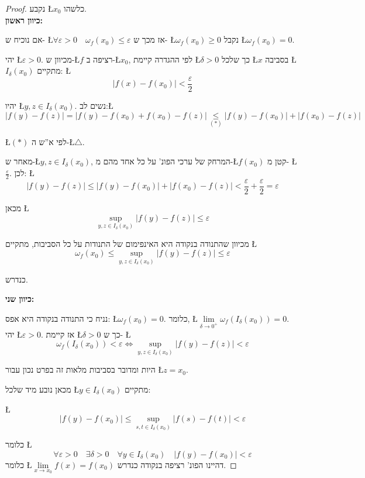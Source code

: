 \documentclass[english,hebrew]{article}
\theoremstyle{remark}
\theoremstyle{definition}
\theoremstyle{plain}
\theoremstyle{remark}
\theoremstyle{plain}
\theoremstyle{plain}
\theoremstyle{definition}
\theoremstyle{plain}
\begin{document}
\begin{proof}
נקבע \L{$x_{0}$} כלשהו.\\

\textbf{כיוון ראשון:}

אם נוכיח ש- \L{$\forall\varepsilon>0\quad\omega_{f}(x_{0})\le\varepsilon$}
אז מכך ש- \L{$\omega_{f}(x_{0})\ge0$} נקבל \L{$\omega_{f}(x_{0})=0$}.

יהי \L{$\varepsilon>0$}. מכיוון ש-\L{$f$} רציפה ב-\L{$x_{0}$},
לפי ההגדרה קיימת \L{$\delta>0$} כך שלכל \L{$x$} בסביבה \L{$I_{\delta}(x_{0})$}
מתקיים: \L{%
\[
|f(x)-f(x_{0})|<\frac{\varepsilon}{2}
\]
}%

יהיו \L{$y,z\in I_{\delta}(x_{0})$}. נשים לב:\L{%
\[
|f(y)-f(z)|=|f(y)-f(x_{0})+f(x_{0})-f(z)|\underset{(*)}{\leq}|f(y)-f(x_{0})|+|f(x_{0})-f(z)|
\]
}%

\L{$(*)$} לפי א\textquotedblright ש ה-\L{$\triangle$}.

מאחר ש-\L{$y,z\in I_{\delta}(x_{0})$}, המרחק של ערכי הפונ' על כל
אחד מהם מ-\L{$f(x_{0})$} קטן מ- \L{$\frac{\varepsilon}{2}$}. לכן:
\L{%
\[
|f(y)-f(z)|\le|f(y)-f(x_{0})|+|f(x_{0})-f(z)|<\frac{\varepsilon}{2}+\frac{\varepsilon}{2}=\varepsilon
\]
}%

מכאן \L{%
\[
\sup_{y,z\in I_{\delta}(x_{0})}|f(y)-f(z)|\leq\varepsilon
\]
}%

מכיוון שהתנודה בנקודה היא האינפימום של התנודות על כל הסביבות, מתקיים
\L{%
\[
\omega_{f}(x_{0})\leq\sup_{y,z\in I_{\delta}(x_{0})}|f(y)-f(z)|\leq\varepsilon
\]
}%

כנדרש.

\vspace{1em}
\textbf{כיוון שני:}

נניח כי התנודה בנקודה היא אפס: \L{$\omega_{f}(x_{0})=0$}. כלומר,
\L{$\underset{\delta\to0^{+}}{\lim}\omega_{f}(I_{\delta}(x_{0}))=0$}.
יהי \L{$\varepsilon>0$}. אז קיימת \L{$\delta>0$} כך ש- \L{%
\[
\omega_{f}(I_{\delta}(x_{0}))<\varepsilon\iff\sup_{y,z\in I_{\delta}(x_{0})}|f(y)-f(z)|<\varepsilon
\]
}%

היות ומדובר בסביבות מלאות זה בפרט נכון עבור \L{$z=x_{0}$}.

מכאן נובע מיד שלכל \L{$y\in I_{\delta}(x_{0})$} מתקיים:

\L{%
\[
|f(y)-f(x_{0})|\leq\sup_{s,t\in I_{\delta}(x_{0})}|f(s)-f(t)|<\varepsilon
\]
}%

כלומר \L{%
\[
\forall\varepsilon>0\quad\exists\delta>0\quad\forall y\in I_{\delta}(x_{0})\quad|f(y)-f(x_{0})|<\varepsilon
\]
}%
 כלומר \L{$\underset{x\rightarrow x_{0}}{\lim}f(x)=f(x_{0})$} דהיינו
הפונ' רציפה בנקודה כנדרש.
\end{proof}
\end{document}
